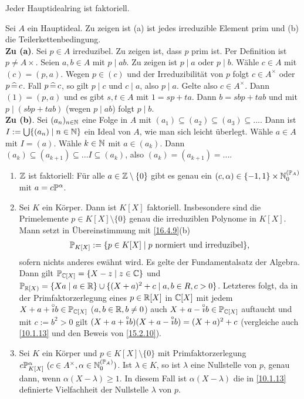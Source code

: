 \documentclass[../../main.tex]{subfiles}
\begin{document}
\begin{kor}\label{16.4.19}
Jeder Hauptidealring ist faktoriell. 
\end{kor}
\begin{cproof}
Sei $A$ ein Hauptideal. Zu zeigen ist (a) ist jedes irreduzible Element prim und (b) die Teilerkettenbedingung.\\

\noindent\textbf{Zu (a)}. Sei $p\in A$ irreduzibel. Zu zeigen ist, dass $p$ prim ist. Per Definition ist $p\neq A\times$. Seien $a,b\in A$ mit $p\mid ab$. Zu zeigen ist $p\mid a$ oder $p\mid b$. Wähle $c\in A$ mit $(c)=(p,a)$. Wegen $p\in (c)$ und der Irreduzibilität von $p$ folgt $c\in A^\times$ oder $p\divi c$. Fall $p\divi c$, so gilt $p\mid c$ und $c\mid a$, also $p\mid a$. Gelte also $c\in A^\times$. Dann $(1)=(p,a)$ und es gibt $s,t\in A$ mit $1=sp+ta$. Dann $b=sbp+tab$ und mit $p\mid(sbp+tab)$ (wegen $p\mid ab$) folgt $p\mid b$.\\

\noindent\textbf{Zu (b)}. Sei $(a_n)_{n\in \N}$ eine Folge in $A$ mit $(a_1)\subseteq (a_2)\subseteq(a_3)\subseteq...$. Dann ist $I:=\bigcup\{(a_n)\mid n\in \N\}$ ein Ideal von $A$, wie man sich leicht überlegt. Wähle $a\in A$ mit $I=(a)$. Wähle $k\in \N$ mit $a\in (a_k)$. Dann $(a_k)\subseteq (a_{k+1})\subseteq... I\subseteq (a_k)$, also $(a_k)=(a_{k+1})=...$.
\end{cproof}

\begin{bsp}\label{16.4.20}
\begin{enumerate}[\normalfont(a)]
\item $\Z$ ist faktoriell: Für alle $a\in\Z\setminus\{0\}$ gibt es genau ein $(c,\alpha)\in \{-1,1\}\times \N_0^{(\P_A)}$ mit $a=c\P^\alpha$.
\item Sei $K$ ein Körper. Dann ist $K[X]$ faktoriell. Insbesondere sind die Primelemente $p\in K[X]\setminus\{0\}$ genau die irreduziblen Polynome in $K[X]$. Mann setzt in Übereinstimmung mit \ref{16.4.9}(b)
\begin{align*}
\P_{K[X]}:=\{p\in K[X]\mid p\text{ normiert und irreduzibel}\},
\end{align*}
sofern nichts anderes ewähnt wird. Es gelte der Fundamentalsatz der Algebra. Dann gilt $\P_{\C[X]}=\{X-z\mid z\in \C\}$ und $\P_{\R[X)}=\{Xa\mid a\in \R\}\cup\{(X+a)^2+c\mid a,b\in R,c>0\}$. Letzteres folgt, da in der Primfaktorzerlegung eines $p\in \R[X]$ in $\C[X]$ mit jedem $X+a+\i b\in\P_{\C[X]}$ ($a,b\in\R,b\neq 0$) auch $X+a-\i b\in\P_{\C[X]}$ auftaucht und mit $c:=b^2>0$ gilt $(X+a+\i b)(X+a-\i b)=(X+a)^2+c$ (vergleiche auch \ref{10.1.13} und den Beweis von \ref{15.2.10}).
\item Sei $K$ ein Körper und $p\in K[X]\setminus\{0\}$ mit Primfaktorzerlegung $c\P_{K[X]}^\alpha\ (c\in A^\times, \alpha\in \N_0^{(\P_A)})$. Ist $\lambda\in K$, so ist $\lambda$ eine Nullstelle von $p$, genau dann, wenn $\alpha(X-\lambda)\ge 1$. In diesem Fall ist $\alpha(X-\lambda)$ die in \ref{10.1.13} definierte Vielfachheit der Nullstelle $\lambda$ von $p$.
\end{enumerate}
\end{bsp}
\end{document}
